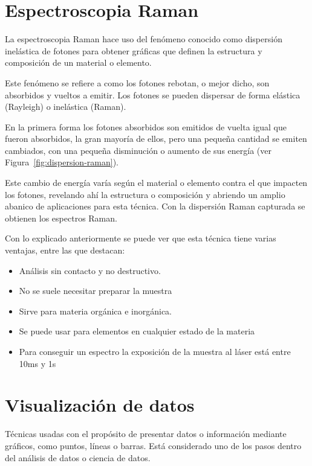
\section{Espectroscopia Raman}\label{def:raman}
La espectroscopia Raman hace uso del fenómeno conocido como dispersión
inelástica de fotones para obtener gráficas que definen la estructura y
composición de un material o elemento.

Este fenómeno se refiere a como los fotones rebotan, o mejor dicho, son
absorbidos y vueltos a emitir. Los fotones se pueden
dispersar de forma elástica (Rayleigh) o inelástica (Raman).

En la primera forma los fotones absorbidos son emitidos de vuelta igual que
fueron absorbidos, la gran mayoría de ellos, pero una pequeña cantidad se emiten
cambiados, con una pequeña disminución o aumento de sus energía (ver
Figura~\ref{fig:dispersion-raman}).

Este cambio de energía varía según el material o elemento contra el que impacten
los fotones, revelando ahí la estructura o composición y abriendo un amplio
abanico de aplicaciones para esta
técnica\cite{what-is-raman,wiki:raman-scatter}. Con la dispersión Raman
capturada se obtienen los espectros Raman.


Con lo explicado anteriormente se puede ver que esta técnica tiene varias
ventajas, entre las que destacan\cite{what-is-raman}:
\begin{itemize}
	\tightlist
	\item Análisis sin contacto y no destructivo.
	\item No se suele necesitar preparar la muestra
	\item Sirve para materia orgánica e inorgánica.
	\item Se puede usar para elementos en cualquier estado de la materia
	\item Para conseguir un espectro la exposición de la muestra al láser está
	entre 10ms y 1s
\end{itemize}

\section{Visualización de datos}

Técnicas usadas con el propósito de presentar datos o información mediante
gráficos, como puntos, líneas o barras. Está considerado uno de los pasos dentro
del análisis de datos o ciencia de datos\cite{wiki:dataviz}.

